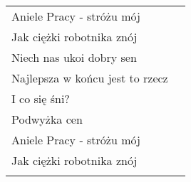 \documentclass[a5paper]{article}
\begin{document}
\noindent
\begin{tabular}{@{}p{6.50cm}p{3cm}@{}}
Aniele Pracy - stróżu mój \\
Jak ciężki robotnika znój \\
Niech nas ukoi dobry sen \\
Najlepsza w końcu jest to rzecz \\
I co się śni? \\
Podwyżka cen \\
Aniele Pracy - stróżu mój \\
Jak ciężki robotnika znój \\ \\
\end{tabular}
\end{document}
